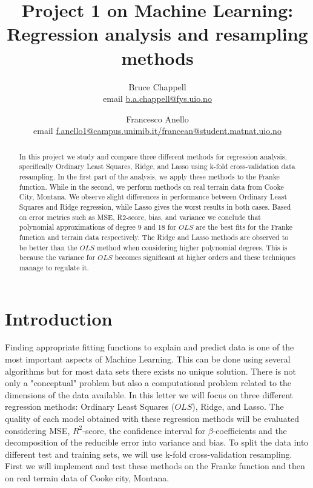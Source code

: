 \documentclass{emulateapj}
\begin{document}
\title{Project 1 on Machine Learning: Regression analysis and resampling methods}

\author{Bruce Chappell \\ email \href{b.a.chappell@fys.uio.no}{b.a.chappell@fys.uio.no} \\
\and Francesco Anello \\ email \href{f.anello1@campus.unimib.it}{f.anello1@campus.unimib.it/francean@student.matnat.uio.no} }

\begin{abstract}
In this project we study and compare three different methods for regression analysis, specifically Ordinary Least Squares, Ridge, and Lasso using k-fold cross-validation data resampling.
In the first part of the analysis, we apply these methods to the Franke function. While in the second, we perform methods on real terrain data from Cooke City, Montana.
We observe slight differences in performance between Ordinary Least Squares and Ridge regression, while Lasso gives the worst results in both cases.
Based on error metrics such as MSE, R2-score, bias, and
variance we conclude that polynomial approximations of degree 9 and 18 for $OLS$ are the best fits for the Franke function and terrain data respectively.
The Ridge and Lasso methods are observed to be better than the $OLS$ method when considering higher polynomial degrees. This is because the variance for $OLS$ becomes significant at higher orders and these techniques manage to regulate it.
\end{abstract}

\section{Introduction}
\label{sec:introduction}
Finding appropriate fitting functions to explain and predict data is one of the most important aspects of Machine Learning. This can be done using several algorithms but for most data sets there exists no unique solution. There is not only a "conceptual" problem but also a computational problem related to the dimensions of the data available.
In this letter we will focus on three different regression methods: Ordinary Least Squares ($OLS$), Ridge, and Lasso. 
The quality of each model obtained with these regression methods will be evaluated considering MSE, $R^2$-score, the confidence interval for $\beta$-coefficients and the decomposition of the reducible error into variance and bias. To split the data into different test and training sets, we will use k-fold cross-validation resampling. First we will implement and test these methods on the Franke function and then on real terrain data of Cooke city, Montana. 
\end{document}
